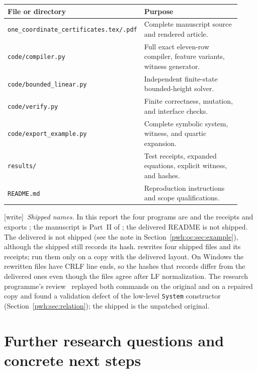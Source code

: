 \documentclass[11pt,letterpaper]{article}
\numberwithin{equation}{section}
\theoremstyle{definition}
\newcommand{\code}[1]{\texttt{\small #1}}
\newcommand{\wtag}{\textup{[write]}}
\begin{document}
\begin{center}
\small
\begin{tabular}{@{}P{0.43\linewidth}P{0.49\linewidth}@{}}
\toprule
File or directory & Purpose\\
\midrule
\code{one\_coordinate\_certificates.tex/.pdf} & Complete manuscript source and rendered article.\\
\code{code/compiler.py} & Full exact eleven-row compiler, feature variants, witness generator.\\
\code{code/bounded\_linear.py} & Independent finite-state bounded-height solver.\\
\code{code/verify.py} & Finite correctness, mutation, and interface checks.\\
\code{code/export\_example.py} & Complete symbolic system, witness, and quartic expansion.\\
\code{results/} & Test receipts, expanded equations, explicit witness, and hashes.\\
\code{README.md} & Reproduction instructions and scope qualifications.\\
\bottomrule
\end{tabular}
\end{center}

\wtag\ \emph{Shipped names.} In this report the four programs are
 and the receipts and exports
; the manuscript is Part~II of
; the delivered README is not shipped. The delivered
 is not shipped (see the note in
Section~\ref{pwh:oc:sec:example}), although the shipped
 still records its hash.
 rewrites four shipped files and
 its receipts; run them only on a copy with the delivered
layout. On Windows the rewritten files have CRLF line ends, so the hashes
that  records differ from the delivered ones even
though the files agree after LF normalization. The research programme's
review~\cite{reviewOC} replayed both commands on the original and on a
repaired copy and found a validation defect of the low-level
\texttt{System} constructor (Section~\ref{pwh:sec:relation}); the shipped
 is the unpatched original.

\section{Further research questions and concrete next steps}
\label{pwh:oc:sec:future}
\end{document}
